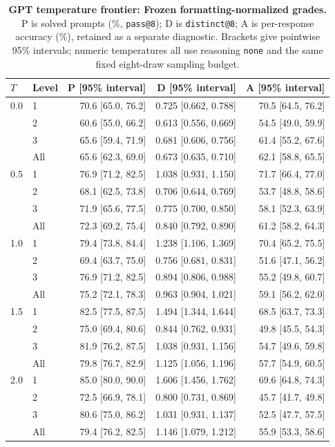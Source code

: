 \begin{table}[!htbp]
\centering
\setlength{\parfillskip}{0pt plus .20\linewidth}
\caption{\textbf{GPT temperature frontier: Frozen formatting-normalized grades.}
P is solved prompts (\%, \texttt{pass@8}); D is \texttt{distinct@8};
A is per-response accuracy (\%), retained as a separate diagnostic.
Brackets give pointwise 95\% intervals;
numeric temperatures all use reasoning \texttt{none} and the same fixed eight-draw sampling budget.}
\small
\setlength{\tabcolsep}{4pt}
\begin{tabular}{@{}llrrr@{}}
\toprule
$T$ & Level & P [95\% interval] & D [95\% interval] & A [95\% interval] \\
\midrule
0.0 & 1 & 70.6 [65.0, 76.2] & 0.725 [0.662, 0.788] & 70.5 [64.5, 76.2] \\
 & 2 & 60.6 [55.0, 66.2] & 0.613 [0.556, 0.669] & 54.5 [49.0, 59.9] \\
 & 3 & 65.6 [59.4, 71.9] & 0.681 [0.606, 0.756] & 61.4 [55.2, 67.6] \\
 & All & 65.6 [62.3, 69.0] & 0.673 [0.635, 0.710] & 62.1 [58.8, 65.5] \\
0.5 & 1 & 76.9 [71.2, 82.5] & 1.038 [0.931, 1.150] & 71.7 [66.4, 77.0] \\
 & 2 & 68.1 [62.5, 73.8] & 0.706 [0.644, 0.769] & 53.7 [48.8, 58.6] \\
 & 3 & 71.9 [65.6, 77.5] & 0.775 [0.700, 0.850] & 58.1 [52.3, 63.9] \\
 & All & 72.3 [69.2, 75.4] & 0.840 [0.792, 0.890] & 61.2 [58.2, 64.3] \\
1.0 & 1 & 79.4 [73.8, 84.4] & 1.238 [1.106, 1.369] & 70.4 [65.2, 75.5] \\
 & 2 & 69.4 [63.7, 75.0] & 0.756 [0.681, 0.831] & 51.6 [47.1, 56.2] \\
 & 3 & 76.9 [71.2, 82.5] & 0.894 [0.806, 0.988] & 55.2 [49.8, 60.7] \\
 & All & 75.2 [72.1, 78.3] & 0.963 [0.904, 1.021] & 59.1 [56.2, 62.0] \\
1.5 & 1 & 82.5 [77.5, 87.5] & 1.494 [1.344, 1.644] & 68.5 [63.7, 73.3] \\
 & 2 & 75.0 [69.4, 80.6] & 0.844 [0.762, 0.931] & 49.8 [45.5, 54.3] \\
 & 3 & 81.9 [76.2, 87.5] & 1.038 [0.931, 1.156] & 54.7 [49.6, 59.8] \\
 & All & 79.8 [76.7, 82.9] & 1.125 [1.056, 1.196] & 57.7 [54.9, 60.5] \\
2.0 & 1 & 85.0 [80.0, 90.0] & 1.606 [1.456, 1.762] & 69.6 [64.8, 74.3] \\
 & 2 & 72.5 [66.9, 78.1] & 0.800 [0.731, 0.869] & 45.7 [41.7, 49.8] \\
 & 3 & 80.6 [75.0, 86.2] & 1.031 [0.931, 1.137] & 52.5 [47.7, 57.5] \\
 & All & 79.4 [76.2, 82.5] & 1.146 [1.079, 1.212] & 55.9 [53.3, 58.6] \\
\bottomrule
\end{tabular}
\end{table}

